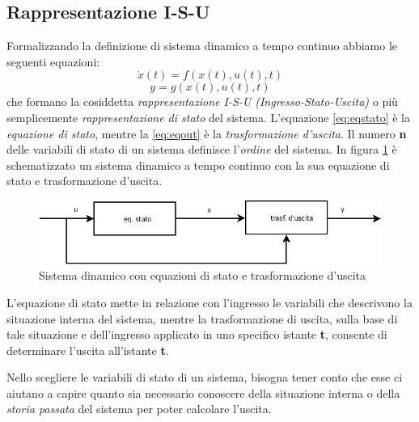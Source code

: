 \documentclass[a4paper]{report}
\begin{document}
\subsection{Rappresentazione I-S-U}
Formalizzando la definizione di sistema dinamico a tempo continuo
abbiamo le seguenti equazioni:
\begin{equation}\label{eq:eqstato}
  \dot{x}(t)=f(x(t),u(t),t)
\end{equation}
\begin{equation}\label{eq:eqout}
  y=g(x(t),u(t),t)
\end{equation}
che formano la cosiddetta \emph {rappresentazione I-S-U
  (Ingresso-Stato-Uscita)} o pi\`u semplicemente
\emph{rappresentazione di stato} del sistema.
L'equazione \ref{eq:eqstato} \`e la \emph{equazione di stato},
mentre la \ref{eq:eqout} \`e la \emph{trasformazione
  d'uscita}. Il numero \textbf{n} delle variabili di stato di un
sistema definisce l'\emph{ordine} del sistema. In figura
\ref{fig:fig4} \`e schematizzato un sistema dinamico a tempo continuo
con la sua equazione di stato e trasformazione d'uscita.
\begin{figure}[!h]
  \begin{center}
    \includegraphics[scale=0.5]{./figures/dynaeq.png}
    \caption{Sistema dinamico con equazioni di stato e trasformazione
      d'uscita}
    \label{fig:fig4}
  \end{center}
\end{figure} 

L'equazione di stato mette in relazione con l'ingresso le variabili
che descrivono la situazione interna del sistema, mentre la
trasformazione di uscita, sulla base di tale situazione e
dell'ingresso applicato in uno specifico istante \textbf{t}, consente
di determinare l'uscita all'istante \textbf{t}. 

Nello scegliere le variabili di stato di un sistema, bisogna tener
conto che esse ci aiutano a capire quanto sia necessario conoscere
della situazione interna o della \emph{storia passata} del sistema per
poter calcolare l'uscita. 
\end{document}
